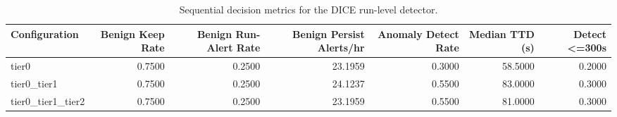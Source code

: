 \begin{table}[t]
\centering
\caption{Sequential decision metrics for the DICE run-level detector.}
\label{tab:dice_sequential_metrics}
\footnotesize
\begin{tabular}{lrrrrrr}
\toprule
Configuration & Benign Keep Rate & Benign Run-Alert Rate & Benign Persist Alerts/hr & Anomaly Detect Rate & Median TTD (s) & Detect <=300s \\
\midrule
tier0 & 0.7500 & 0.2500 & 23.1959 & 0.3000 & 58.5000 & 0.2000 \\
tier0_tier1 & 0.7500 & 0.2500 & 24.1237 & 0.5500 & 83.0000 & 0.3000 \\
tier0_tier1_tier2 & 0.7500 & 0.2500 & 23.1959 & 0.5500 & 81.0000 & 0.3000 \\
\bottomrule
\end{tabular}

\end{table}
